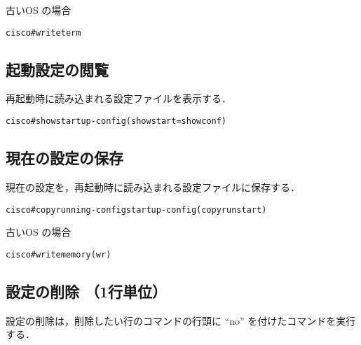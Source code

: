 古いOS の場合

\begin{center}
\begin{screen}
\begin{alltt}
cisco#write term
\end{alltt}
\end{screen}
\end{center}


\subsection*{起動設定の閲覧}
再起動時に読み込まれる設定ファイルを表示する．

\begin{center}
\begin{screen}
\begin{alltt}
cisco#show startup-config   (show start = show conf)
\end{alltt}
\end{screen}
\end{center}

\subsection*{現在の設定の保存}
現在の設定を，再起動時に読み込まれる設定ファイルに保存する．

\begin{center}
\begin{screen}
\begin{alltt}
cisco#copy running-config startup-config    (copy run start)
\end{alltt}
\end{screen}
\end{center}

古いOS の場合

\begin{center}
\begin{screen}
\begin{alltt}
cisco#write memory    (wr)
\end{alltt}
\end{screen}
\end{center}

\subsection*{設定の削除 （1行単位）}
設定の削除は，削除したい行のコマンドの行頭に ``no'' を付けたコマンドを実行する．

